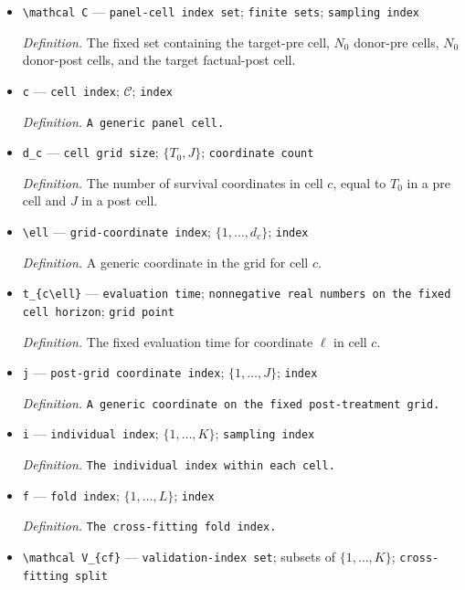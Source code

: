 \documentclass{article}
\begin{document}
\begin{itemize}
  \item \texttt{\textbackslash{}\allowbreak{}mathcal C} --- \texttt{panel-\allowbreak{}cell index set}; \texttt{finite sets}; \texttt{sampling index}
  \par\smallskip\noindent\emph{Definition.} The fixed set containing the target-pre cell, \(N_0\) donor-pre cells, \(N_0\) donor-post cells, and the target factual-post cell.
  \item \texttt{c} --- \texttt{cell index}; \(\mathcal C\); \texttt{index}
  \par\smallskip\noindent\emph{Definition.} \texttt{A generic panel cell.}
  \item \texttt{d\_\allowbreak{}c} --- \texttt{cell grid size}; \(\{T_0,J\}\); \texttt{coordinate count}
  \par\smallskip\noindent\emph{Definition.} The number of survival coordinates in cell \(c\), equal to \(T_0\) in a pre cell and \(J\) in a post cell.
  \item \texttt{\textbackslash{}\allowbreak{}ell} --- \texttt{grid-\allowbreak{}coordinate index}; \(\{1,\ldots,d_c\}\); \texttt{index}
  \par\smallskip\noindent\emph{Definition.} A generic coordinate in the grid for cell \(c\).
  \item \texttt{t\_\allowbreak{}\{c\textbackslash{}\allowbreak{}ell\}\allowbreak{}} --- \texttt{evaluation time}; \texttt{nonnegative real numbers on the fixed cell horizon}; \texttt{grid point}
  \par\smallskip\noindent\emph{Definition.} The fixed evaluation time for coordinate \(\ell\) in cell \(c\).
  \item \texttt{j} --- \texttt{post-\allowbreak{}grid coordinate index}; \(\{1,\ldots,J\}\); \texttt{index}
  \par\smallskip\noindent\emph{Definition.} \texttt{A generic coordinate on the fixed post-\allowbreak{}treatment grid.}
  \item \texttt{i} --- \texttt{individual index}; \(\{1,\ldots,K\}\); \texttt{sampling index}
  \par\smallskip\noindent\emph{Definition.} \texttt{The individual index within each cell.}
  \item \texttt{f} --- \texttt{fold index}; \(\{1,\ldots,L\}\); \texttt{index}
  \par\smallskip\noindent\emph{Definition.} \texttt{The cross-\allowbreak{}fitting fold index.}
  \item \texttt{\textbackslash{}\allowbreak{}mathcal V\_\allowbreak{}\{cf\}\allowbreak{}} --- \texttt{validation-\allowbreak{}index set}; subsets of \(\{1,\ldots,K\}\); \texttt{cross-\allowbreak{}fitting split}

\end{itemize}
\end{document}
